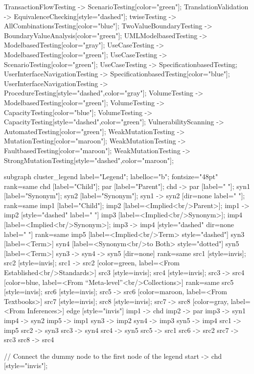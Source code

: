\documentclass{article}
\begin{document}
{TransactionFlowTesting -> ScenarioTesting[color="green"];
TranslationValidation -> EquivalenceChecking[style="dashed"];
twiseTesting -> AllCombinationsTesting[color="blue"];
TwoValueBoundaryTesting -> BoundaryValueAnalysis[color="green"];
UMLModelbasedTesting -> ModelbasedTesting[color="gray"];
UseCaseTesting -> ModelbasedTesting[color="green"];
UseCaseTesting -> ScenarioTesting[color="green"];
UseCaseTesting -> SpecificationbasedTesting;
UserInterfaceNavigationTesting -> SpecificationbasedTesting[color="blue"];
UserInterfaceNavigationTesting -> ProcedureTesting[style="dashed",color="gray"];
VolumeTesting -> ModelbasedTesting[color="green"];
VolumeTesting -> CapacityTesting[color="blue"];
VolumeTesting -> CapacityTesting[style="dashed",color="green"];
VulnerabilityScanning -> AutomatedTesting[color="green"];
WeakMutationTesting -> MutationTesting[color="maroon"];
WeakMutationTesting -> FaultbasedTesting[color="maroon"];
WeakMutationTesting -> StrongMutationTesting[style="dashed",color="maroon"];

subgraph cluster_legend {
    label="Legend";
    labelloc="b";
    fontsize="48pt"
    {
        rank=same
        chd [label="Child"];
        par [label="Parent"];
        chd -> par [label="                "];
        syn1 [label="Synonym"];
        syn2 [label="Synonym"];
        syn1 -> syn2 [dir=none label="                "];
    }
    {
        rank=same
        imp1 [label="Child"];
        imp2 [label=<Implied<br/>Parent>];
        imp1 -> imp2 [style="dashed" label="                "]
        imp3 [label=<Implied<br/>Synonym>];
        imp4 [label=<Implied<br/>Synonym>];
        imp3 -> imp4 [style="dashed" dir=none label="                "]
    }
    {
        rank=same
        imp5 [label=<Implied<br/>Term> style="dashed"]
        syn3 [label=<Term>]
        syn4 [label=<Synonym<br/>to Both> style="dotted"]
        syn5 [label=<Term>]
        syn3 -> syn4 -> syn5 [dir=none]
    }
{
rank=same
src1 [style=invis];
src2 [style=invis];
src1 -> src2 [color=green, label=<From Established<br/>Standards>]
src3 [style=invis];
src4 [style=invis];
src3 -> src4 [color=blue, label=<From ``Meta-level''<br/>Collections>]
}
{
rank=same
src5 [style=invis];
src6 [style=invis];
src5 -> src6 [color=maroon, label=<From Textbooks>]
src7 [style=invis];
src8 [style=invis];
src7 -> src8 [color=gray, label=<From Inferences>]
}
    edge [style="invis"]
    imp1 -> chd
    imp2 -> par
    imp3 -> syn1
    imp4 -> syn2
imp5 -> imp1
syn3 -> imp2
syn4 -> imp3
syn5 -> imp4
src1 -> imp5
src2 -> syn3
src3 -> syn4
src4 -> syn5
src5 -> src1
src6 -> src2
src7 -> src3
src8 -> src4
}

// Connect the dummy node to the first node of the legend
start -> chd [style="invis"];
}
\end{document}
